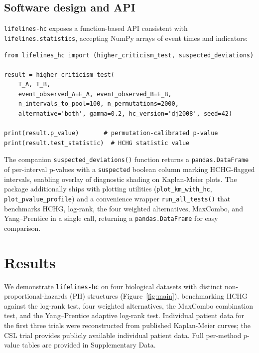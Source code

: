 \documentclass[unnumsec,webpdf,contemporary,large]{oup-authoring-template}
\begin{document}
\subsection*{Software design and API}

\texttt{lifelines-hc} exposes a function-based API consistent with
\texttt{lifelines.statistics}, accepting NumPy arrays of event times and
indicators:

\begin{lstlisting}
from lifelines_hc import (higher_criticism_test, suspected_deviations)

result = higher_criticism_test(
    T_A, T_B,
    event_observed_A=E_A, event_observed_B=E_B,
    n_intervals_to_pool=100, n_permutations=2000,
    alternative='both', gamma=0.2, hc_version='dj2008', seed=42)

print(result.p_value)       # permutation-calibrated p-value
print(result.test_statistic)  # HCHG statistic value
\end{lstlisting}

\noindent
The companion \texttt{suspected\_deviations()} function returns a
\texttt{pandas.DataFrame} of per-interval p-values with a
\texttt{suspected} boolean column marking HCHG-flagged intervals,
enabling overlay of diagnostic shading on Kaplan-Meier plots. 
The package additionally ships with plotting utilities
(\texttt{plot\_km\_with\_hc}, \texttt{plot\_pvalue\_profile}) and a
convenience wrapper \texttt{run\_all\_tests()} that benchmarks HCHG, log-rank, the four weighted alternatives, MaxCombo, and Yang--Prentice in a single
call, returning a \texttt{pandas.DataFrame} for easy comparison.


\section{Results}

We demonstrate \texttt{lifelines-hc} on four biological datasets with
distinct non-proportional-hazards (PH) structures (Figure~\ref{fig:main}), benchmarking HCHG
against the log-rank test, four weighted alternatives, the MaxCombo combination test, and the Yang--Prentice adaptive log-rank test.
Individual patient data for the first three trials were reconstructed from
published Kaplan-Meier curves; the CSL trial provides publicly available individual patient data.
Full per-method $p$-value tables are provided in Supplementary Data.
\end{document}
